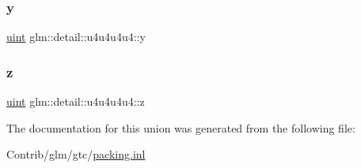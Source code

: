 \subsubsection{\texorpdfstring{y}{y}}
{\footnotesize\ttfamily \mbox{\hyperlink{group__core__precision_ga4fd29415871152bfb5abd588334147c8}{uint}} glm\+::detail\+::u4u4u4u4\+::y}

\mbox{\label{unionglm_1_1detail_1_1u4u4u4u4_a1635b8d41a367114239565da102ad6b9}} 
\subsubsection{\texorpdfstring{z}{z}}
{\footnotesize\ttfamily \mbox{\hyperlink{group__core__precision_ga4fd29415871152bfb5abd588334147c8}{uint}} glm\+::detail\+::u4u4u4u4\+::z}



The documentation for this union was generated from the following file\+:\begin{DoxyCompactItemize}
\item 
Contrib/glm/gtc/\mbox{\hyperlink{packing_8inl}{packing.\+inl}}\end{DoxyCompactItemize}
